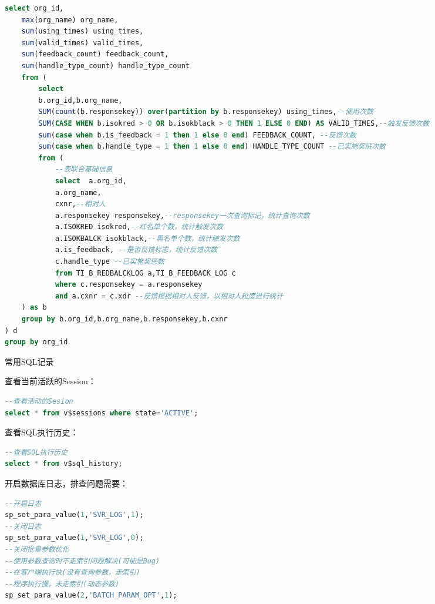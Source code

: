 \documentclass[12pt]{book}
\makeatletter
\numberwithin{dummy}{section}
\theoremstyle{ocrenumbox}
\theoremstyle{blacknumex}
\theoremstyle{blacknumbox}
\theoremstyle{ocrenum}
\renewcommand{\subsection}{\@startsection {subsection}{2}{\z@}
	{-3ex \@plus -0.1ex \@minus -.4ex}
	{0.5ex \@plus.2ex }
	{\normalfont\sffamily\bfseries}}
\newlength\esp
\makeatother
\begin{document}
\begin{lstlisting}[language=SQL]
select org_id,
	max(org_name) org_name,
	sum(using_times) using_times,
	sum(valid_times) valid_times,
	sum(feedback_count) feedback_count,
	sum(handle_type_count) handle_type_count
	from (
		select 
		b.org_id,b.org_name,
		SUM(count(b.responsekey)) over(partition by b.responsekey) using_times,--使用次数
		SUM(CASE WHEN b.isokred > 0 OR b.isokblack > 0 THEN 1 ELSE 0 END) AS VALID_TIMES,--触发反馈次数
		sum(case when b.is_feedback = 1 then 1 else 0 end) FEEDBACK_COUNT, --反馈次数
		sum(case when b.handle_type = 1 then 1 else 0 end) HANDLE_TYPE_COUNT --已实施奖惩次数
		from (
			--表联合基础信息
			select  a.org_id,
			a.org_name,
			cxnr,--相对人
			a.responsekey responsekey,--responsekey一次查询标记，统计查询次数
			a.ISOKRED isokred,--红名单个数，统计触发次数
			a.ISOKBALCK isokblack,--黑名单个数，统计触发次数
			a.is_feedback, --是否反馈标志，统计反馈次数
			c.handle_type --已实施奖惩数
			from TI_B_REDBALCKLOG a,TI_B_FEEDBACK_LOG c
			where c.responsekey = a.responsekey
			and a.cxnr = c.xdr --反馈根据相对人反馈，以相对人粒度进行统计
	) as b
	group by b.org_id,b.org_name,b.responsekey,b.cxnr
) d
group by org_id
\end{lstlisting}



\subsection{常用SQL记录}

查看当前活跃的Session：

\begin{lstlisting}[language=SQL]
--查看活动的Sesion
select * from v$sessions where state='ACTIVE';
\end{lstlisting}

查看SQL执行历史：

\begin{lstlisting}[language=SQL]
--查看SQL执行历史
select * from v$sql_history;
\end{lstlisting}

开启数据库日志，排查问题需要：

\begin{lstlisting}[language=SQL]
--开启日志
sp_set_para_value(1,'SVR_LOG',1);
--关闭日志
sp_set_para_value(1,'SVR_LOG',0);
--关闭批量参数优化
--使用参数查询时不走索引问题解决(可能是Bug)
--在客户端执行快(没有查询参数，走索引)
--程序执行慢，未走索引(动态参数)
sp_set_para_value(2,'BATCH_PARAM_OPT',1);
\end{lstlisting}
\end{document}
